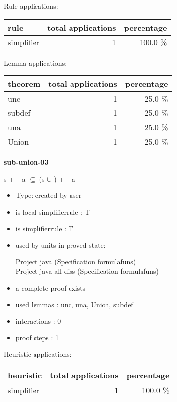 \documentclass[a4paper]{article}
\begin{document}
Rule applications:

\begin{supertabular}{l|r|r}
rule	        & total applications & percentage \\ \hline
simplifier & 1 & 100.0 \% \\

\end{supertabular}

Lemma applications:

\begin{supertabular}{l|r|r}
theorem	        & total applications & percentage \\ \hline
unc & 1 & 25.0 \% \\
subdef & 1 & 25.0 \% \\
una & 1 & 25.0 \% \\
Union & 1 & 25.0 \% \\

\end{supertabular}
\pagebreak

{\LARGE\bf sub-union-03}\label{lemma-sub-union-03}

\medskip

 \Fol s ++ a $\subseteq$ (s $\cup$ ) ++ a

\begin{itemize}

\item Type: created by user

\item is local simplifierrule : T
\item is simplifierrule : T
\item used by units in proved state:

Project java (Specification formulafuns) \\
Project java-all-diss (Specification formulafuns)
\item       a complete proof exists
\item       used lemmas  : unc, una, Union, subdef
\item       interactions : 0
\item       proof steps  : 1
\end{itemize}

\medskip


Heuristic applications:

\begin{supertabular}{l|r|r}
heuristic	& total applications & percentage \\ \hline
simplifier & 1 & 100.0 \% \\

\end{supertabular}
\end{document}
